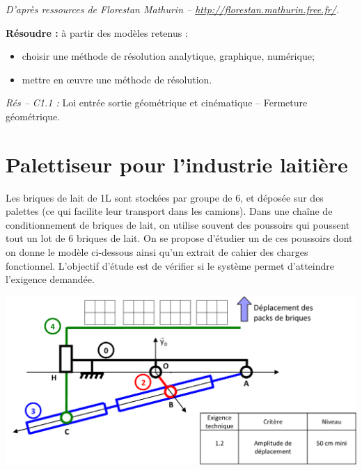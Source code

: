 \documentclass[10pt]{article}
\begin{document}

\begin{flushright}
\textit{D'après ressources de Florestan Mathurin -- \url{http://florestan.mathurin.free.fr/}.}
\end{flushright}





\begin{comp}
\noindent \textbf{Résoudre :} à partir des modèles retenus :
\begin{itemize}
\item choisir une méthode de résolution analytique, graphique, numérique;
\item mettre en \oe{}uvre une méthode de résolution.
\end{itemize}

\noindent \textit{Rés -- C1.1 :} Loi entrée sortie géométrique et cinématique -- Fermeture géométrique.

\end{comp}



\section*{Palettiseur pour l'industrie laitière}

Les briques de lait de 1L sont stockées par groupe de 6, et déposée sur des palettes (ce qui facilite leur transport dans les camions). Dans une chaîne de conditionnement de briques de lait, on utilise souvent des poussoirs qui poussent tout un lot de 6 briques de lait. On se propose d'étudier un de ces poussoirs dont on donne le modèle ci-dessous ainsi qu’un extrait de cahier des charges fonctionnel. L'objectif d’étude est de vérifier si le système permet d'atteindre l’exigence demandée. 

\begin{center}
\includegraphics[width=.7\textwidth]{images/Fig1Bis}
\end{center}
\end{document}
